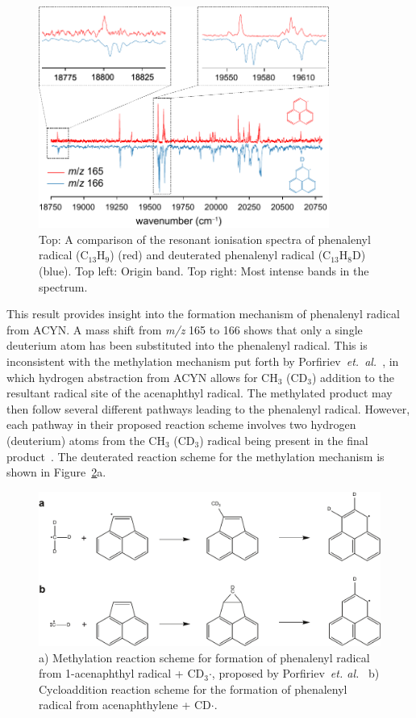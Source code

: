 \documentclass[journal=jacsat,manuscript=article,layout=onecolumn]{achemso}
\begin{document}
\begin{figure}[h!]
	\includegraphics[width=0.85\textwidth]{Figures/Figure3}
	\caption{Top: A comparison of the resonant ionisation spectra of phenalenyl radical (C$_{13}$H$_9$) (red) and deuterated phenalenyl radical (C$_{13}$H$_8$D) (blue). Top left: Origin band. Top right: Most intense bands in the spectrum.}
	\label{fig3}
\end{figure}

This result provides insight into the formation mechanism of phenalenyl radical from ACYN. A mass shift from \textit{m/z} 165 to 166 shows that only a single deuterium atom has been substituted into the phenalenyl radical. This is inconsistent with the methylation mechanism put forth by Porfiriev~\textit{et.}~\textit{al.}~\cite{por20}, in which hydrogen abstraction from ACYN allows for CH$_3$ (CD$_3$) addition to the resultant radical site of the acenaphthyl radical. The methylated product may then follow several different pathways leading to the phenalenyl radical. However, each pathway in their proposed reaction scheme involves two hydrogen (deuterium) atoms from the CH$_3$ (CD$_3$) radical being present in the final product~\cite{por20}. The deuterated reaction scheme for the methylation mechanism is shown in Figure~\ref{fig4}a.

\begin{figure}[h!]
	\includegraphics[width=1\textwidth]{Figures/Figure4}
	\caption{ a) Methylation reaction scheme for formation of phenalenyl radical from 1-acenaphthyl radical + CD$_3$$\cdot$, proposed by Porfiriev~\textit{et. al.}~\cite{por20}
		b) Cycloaddition reaction scheme for the formation of phenalenyl radical from acenaphthylene + CD$\cdot$.}
	\label{fig4}
\end{figure}
\end{document}
